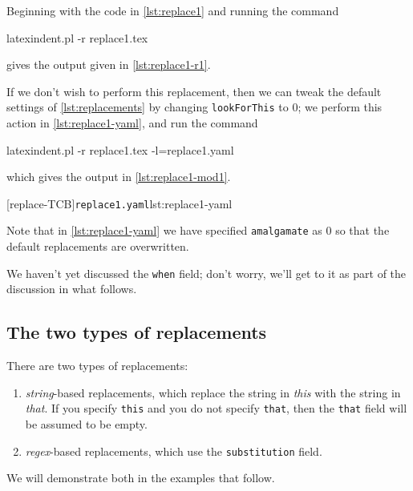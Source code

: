  \begin{example}
 Beginning with the code in \cref{lst:replace1} and running the command 

 \begin{commandshell}
latexindent.pl -r replace1.tex
\end{commandshell}

 gives the output given in \cref{lst:replace1-r1}.

 \begin{cmhtcbraster}[raster column skip=.01\linewidth]
 \end{cmhtcbraster}

 If we don't wish to perform this replacement, then we can tweak the default settings of
 \vref{lst:replacements} by changing \texttt{lookForThis} to 0; we perform this action in
 \cref{lst:replace1-yaml}, and run the command 

 \begin{commandshell}
latexindent.pl -r replace1.tex -l=replace1.yaml
\end{commandshell}

 which gives the output in \cref{lst:replace1-mod1}.

 \begin{cmhtcbraster}[raster column skip=.01\linewidth]
  [replace-TCB]{\texttt{replace1.yaml}}{lst:replace1-yaml}
 \end{cmhtcbraster}

 Note that in \cref{lst:replace1-yaml} we have specified \texttt{amalgamate} as 0 so that
 the default replacements are overwritten.
 \end{example}

 We haven't yet discussed the \texttt{when} field; don't worry, we'll get to it as part of
 the discussion in what follows.

\subsection{The two types of replacements}
 There are two types of replacements:
 \begin{enumerate}
  \item \emph{string}-based replacements, which replace the string in
        \emph{this} with the string in \emph{that}.
        If you specify \texttt{this} and you do not specify \texttt{that}, then the \texttt{that}
        field will be assumed to be empty.
  \item \emph{regex}-based replacements, which use the \texttt{substitution} field.
 \end{enumerate}
 We will demonstrate both in the examples that follow.

